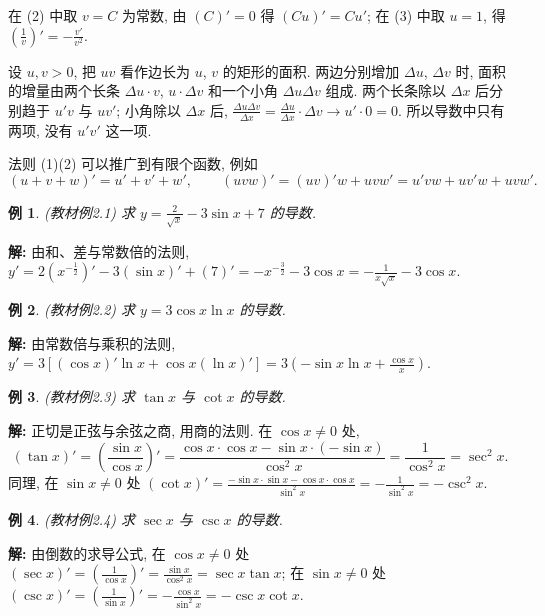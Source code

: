 \documentclass[UTF8,openany]{ctexbook}
\theoremstyle{chinesetextbook}
\newtheorem{example}{例}[section]
\newenvironment{cnsolution}{\par\indent\textbf{解:} \ignorespaces}{\par}
\begin{document}
在 (2) 中取 $v=C$ 为常数, 由 $(C)'=0$ 得 $(Cu)'=Cu'$; 在 (3) 中取 $u=1$, 得 $\displaystyle\left(\frac1v\right)'=-\frac{v'}{v^2}$.

设 $u,v>0$, 把 $uv$ 看作边长为 $u$, $v$ 的矩形的面积. 两边分别增加 $\Delta u$, $\Delta v$ 时, 面积的增量由两个长条 $\Delta u\cdot v$, $u\cdot\Delta v$ 和一个小角 $\Delta u\Delta v$ 组成. 两个长条除以 $\Delta x$ 后分别趋于 $u'v$ 与 $uv'$; 小角除以 $\Delta x$ 后, $\displaystyle\frac{\Delta u\Delta v}{\Delta x}=\frac{\Delta u}{\Delta x}\cdot\Delta v\to u'\cdot0=0$. 所以导数中只有两项, 没有 $u'v'$ 这一项.

法则 (1)(2) 可以推广到有限个函数, 例如
\[
(u+v+w)'=u'+v'+w',\qquad(uvw)'=(uv)'w+uvw'=u'vw+uv'w+uvw'.
\]
\begin{example}\label{ex:c2-2-1}
\textnormal{(教材例2.1)} 求 $\displaystyle y=\frac2{\sqrt x}-3\sin x+7$ 的导数.
\end{example}
\begin{cnsolution}
由和、差与常数倍的法则, $\displaystyle y'=2\left(x^{-\frac12}\right)'-3(\sin x)'+(7)'=-x^{-\frac32}-3\cos x=-\frac1{x\sqrt x}-3\cos x$.
\end{cnsolution}
\begin{example}\label{ex:c2-2-2}
\textnormal{(教材例2.2)} 求 $y=3\cos x\ln x$ 的导数.
\end{example}
\begin{cnsolution}
由常数倍与乘积的法则, $\displaystyle y'=3\left[(\cos x)'\ln x+\cos x(\ln x)'\right]=3\left(-\sin x\ln x+\frac{\cos x}x\right)$.
\end{cnsolution}
\begin{example}\label{ex:c2-2-3}
\textnormal{(教材例2.3)} 求 $\tan x$ 与 $\cot x$ 的导数.
\end{example}
\begin{cnsolution}
正切是正弦与余弦之商, 用商的法则. 在 $\cos x\ne0$ 处,
\[
(\tan x)'=\left(\frac{\sin x}{\cos x}\right)'=\frac{\cos x\cdot\cos x-\sin x\cdot(-\sin x)}{\cos^2x}=\frac1{\cos^2x}=\sec^2x.
\]
同理, 在 $\sin x\ne0$ 处 $\displaystyle(\cot x)'=\frac{-\sin x\cdot\sin x-\cos x\cdot\cos x}{\sin^2x}=-\frac1{\sin^2x}=-\csc^2x$.
\end{cnsolution}
\begin{example}\label{ex:c2-2-4}
\textnormal{(教材例2.4)} 求 $\sec x$ 与 $\csc x$ 的导数.
\end{example}
\begin{cnsolution}
由倒数的求导公式, 在 $\cos x\ne0$ 处 $\displaystyle(\sec x)'=\left(\frac1{\cos x}\right)'=\frac{\sin x}{\cos^2x}=\sec x\tan x$; 在 $\sin x\ne0$ 处 $\displaystyle(\csc x)'=\left(\frac1{\sin x}\right)'=-\frac{\cos x}{\sin^2x}=-\csc x\cot x$.
\end{cnsolution}
\end{document}
